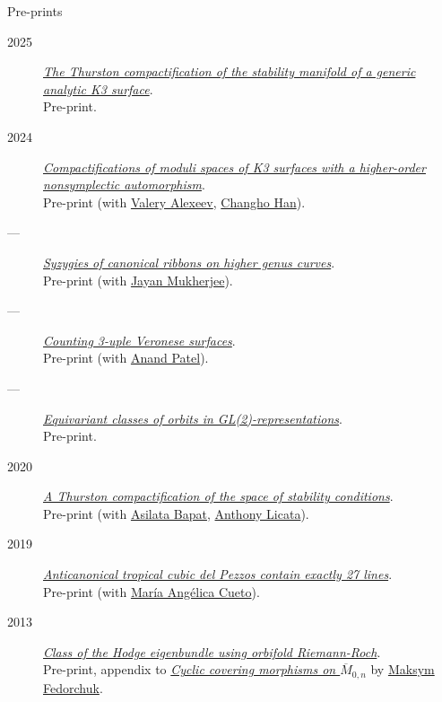 \documentclass[11pt]{article}
\begin{document}
\begin{description}
\item[{Pre-prints}] 
\end{description}
\label{org1003b9f}
\begin{description}
\item[{2025}] \emph{\href{papers/CompStabGenK3.pdf}{The Thurston compactification of the stability manifold of a generic analytic K3 surface}}.\\
Pre-print.
\item[{2024}] \emph{\href{papers/k3z3.pdf}{Compactifications of moduli spaces of K3 surfaces with a higher-order nonsymplectic automorphism}}.\\
Pre-print (with \href{https://www.math.uga.edu/directory/people/valery-alexeev}{Valery Alexeev}, \href{https://sites.google.com/view/changho-han/}{Changho Han}).
\item[{---}] \emph{\href{papers/highergenusribbons.pdf}{Syzygies of canonical ribbons on higher genus curves}}.\\
Pre-print (with \href{https://sites.google.com/view/mukherjeejayan}{Jayan Mukherjee}).
\item[{---}] \emph{\href{papers/3veroneseP2.pdf}{Counting 3-uple Veronese surfaces}}.\\
Pre-print (with \href{https://sites.google.com/view/anand-patel}{Anand Patel}).
\item[{---}] \emph{\href{papers/gl2orbits.pdf}{Equivariant classes of orbits in GL(2)-representations}}.\\
Pre-print.
\item[{2020}] \emph{\href{papers/a2-compactification.pdf}{A Thurston compactification of the space of stability conditions}}.\\
Pre-print (with \href{https://asilata.org/}{Asilata Bapat}, \href{https://maths-people.anu.edu.au/\~licatat/}{Anthony Licata}).
\item[{2019}] \emph{\href{papers/lines\_on\_tropical\_cubics.pdf}{Anticanonical tropical cubic del Pezzos contain exactly 27 lines}}.\\
Pre-print (with \href{https://people.math.osu.edu/cueto.5/}{María Angélica Cueto}).
\item[{2013}] \emph{\href{papers/CyclicAppendix.pdf}{Class of the Hodge eigenbundle using orbifold Riemann-Roch}}.\\
Pre-print, appendix to \href{https://drive.google.com/file/d/1wq-Fh3DiqODc51t-J0phIexVF7B4lxsY/view}{\emph{Cyclic covering morphisms on \(\overline M_{0,n}\)}} by \href{https://www2.bc.edu/maksym-fedorchuk/}{Maksym Fedorchuk}.
\end{description}
\end{document}
